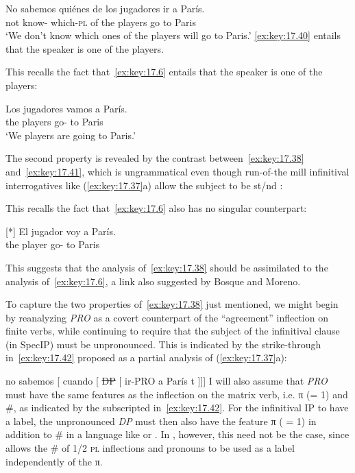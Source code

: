 \documentclass[output=paper]{langsci/langscibook}
\begin{document}
\ea\label{ex:key:17.40}
    \gll    No sabemos quiénes de los jugadores ir a París.\\
            not know-\Fpl{} which-\textsc{pl} of the players go to Paris\\
    \glt    ‘We don’t know which ones of the players will go to Paris.’
\z
\eqref{ex:key:17.40} entails that the speaker is one of the players.

This recalls the fact that~\eqref{ex:key:17.6} entails that the speaker is one of
the players:

\begin{exe}
\exi{\eqref{ex:key:17.6}}
    \gll    Los jugadores vamos a París.\\
            the players      go-\Fpl{} to Paris\\
    \glt    ‘We players are going to Paris.’\\
\end{exe}
The second property is revealed by the contrast between~\eqref{ex:key:17.38}
and~\eqref{ex:key:17.41}, which is ungrammatical even though run-of-the mill
infinitival interrogatives like (\ref{ex:key:17.37}a) allow the subject to be
\First{}st/\Second{}nd \Sg:

\label{ex:key:17.41}
\z
This recalls the fact that~\eqref{ex:key:17.6} also has no singular counterpart:

\begin{exe}
\exi{\eqref{ex:key:17.19}}[*]{%
    \gll El jugador voy a París.\\
        the player go-\Fsg{} to Paris\\
    \glt}
\end{exe}
This suggests that the analysis of~\eqref{ex:key:17.38} should be assimilated to the
analysis of~\eqref{ex:key:17.6}, a link also suggested by Bosque and Moreno.

To capture the two properties of~\eqref{ex:key:17.38} just mentioned, we might
begin by reanalyzing \emph{PRO} as a covert counterpart of the “agreement”
inflection on finite verbs, while continuing to require that the subject of the
infinitival clause (in SpecIP) must be unpronounced. This is indicated by the
strike-through in~\eqref{ex:key:17.42} proposed as a partial analysis of
(\ref{ex:key:17.37}a):

\ea\label{ex:key:17.42}
    no sabemos\tss{\Fpl} [ cuando [ \sout{DP} [ ir-PRO\tss{\Fpl} a París t ]]]
\z
I will also assume that \emph{PRO} must have the same features as the
inflection on the matrix verb, i.e. π (= 1) and \#, as indicated by the
subscripted \Fpl{} in~\eqref{ex:key:17.42}. For the infinitival IP to have a label,
the unpronounced \emph{DP} must then also have the feature π ( = 1) in addition
to \# in a language like  or . In , however, this need not
be the case, since  allows the \# of 1/2 \textsc{pl} inflections and
pronouns to be used as a label independently of the π.
\end{document}
